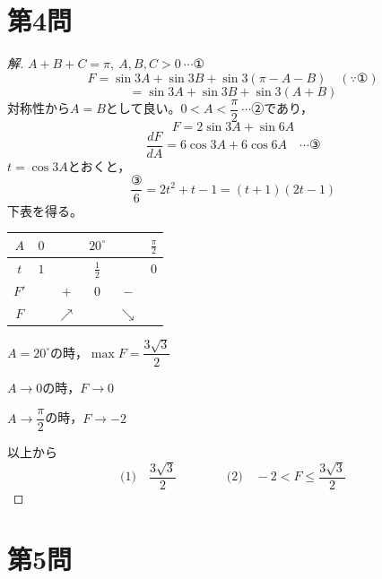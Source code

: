 \documentclass[../main.tex]{subfiles}
\begin{document}

\newpage

\section*{第4問}

\begin{proof}[解]
  $A+B+C=\pi,\ A,B,C>0\ \cdots$①
  \[
    F=\sin3A+\sin3B+\sin3(\pi-A-B) \quad(\because①)
  \]
  \[
    =\sin3A+\sin3B+\sin3(A+B)
  \]
  対称性から$A=B$として良い。$0<A<\dfrac{\pi}{2}\ \cdots$②であり，
  \[
    F=2\sin3A+\sin6A
  \]
  \[
    \frac{dF}{dA}=6\cos3A+6\cos6A \quad\cdots\text{③}
  \]
  $t=\cos3A$とおくと，
  \[
    \frac{③}{6}=2t^2+t-1=(t+1)(2t-1)
  \]
  下表を得る。
  \begin{center}
    \begin{tabular}{c|ccccc}
      $A$ & $0$ & & $20^\circ$ & & $\frac{\pi}{2}$ \\
      \hline
      $t$ & $1$ & & $\frac12$ & & $0$ \\
      \hline
      $F'$ & & $+$ & $0$ & $-$ & \\
      \hline
      $F$ & & $\nearrow$ & & $\searrow$ &
    \end{tabular}
  \end{center}
  $A=20^\circ$の時，$\max F=\dfrac{3\sqrt3}{2}$

  $A\to0$の時，$F\to0$

  $A\to\dfrac{\pi}{2}$の時，$F\to-2$

  以上から
  \[
    \text{(1)}\quad\frac{3\sqrt3}{2} \qquad\qquad \text{(2)}\quad -2<F\le\frac{3\sqrt3}{2}
  \]
\end{proof}

\newpage

\section*{第5問}
\end{document}
